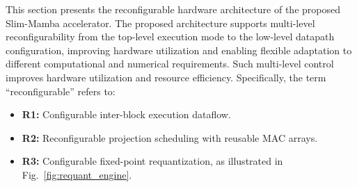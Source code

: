 \documentclass[lettersize,journal]{IEEEtran}
\begin{document}
This section presents the reconfigurable hardware architecture of the proposed
Slim-Mamba accelerator. The proposed architecture supports multi-level reconfigurability from the top-level execution mode to the low-level datapath configuration, improving hardware utilization and enabling flexible adaptation to different computational and numerical requirements. Such multi-level control improves hardware utilization and resource efficiency. Specifically, the term ``reconfigurable''  refers to:
\begin{itemize}
    \item \textbf{R1:} Configurable inter-block execution dataflow.

    \item \textbf{R2:} Reconfigurable projection scheduling with reusable MAC arrays.


    \item \textbf{R3:} Configurable fixed-point requantization, as illustrated in
    Fig.~\ref{fig:requant_engine}.
\end{itemize}

\end{document}
